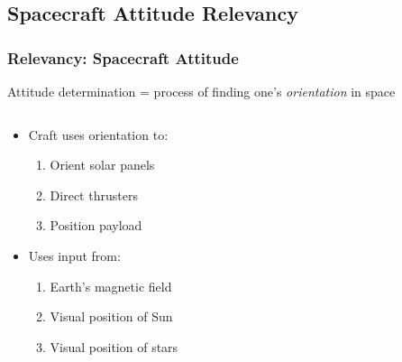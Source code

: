 \documentclass[11pt]{beamer}
\begin{document}
    \subsection{Spacecraft Attitude Relevancy}\label{subsec:spacecraftAttitudeRelevancy}
    \begin{frame}
        \frametitle{Relevancy: Spacecraft Attitude}
        \begin{definition}
            Attitude determination = process of finding one's \textit{orientation} in space
        \end{definition} \medskip
        \begin{columns}
            \begin{column}{0.5\textwidth}
                \begin{itemize}[<+->]
                    \item Craft uses orientation to: \medskip
                    \begin{enumerate}
                        \item Orient solar panels
                        \item Direct thrusters
                        \item Position payload
                    \end{enumerate} \medskip
                    \item Uses input from: \medskip
                    \begin{enumerate}
                        \item Earth's magnetic field
                        \item Visual position of Sun
                        \item Visual position of stars
                    \end{enumerate}
                \end{itemize}
            \end{column}
            \begin{column}{0.5\textwidth}

\end{column}
\end{columns}
\end{frame}
\end{document}
